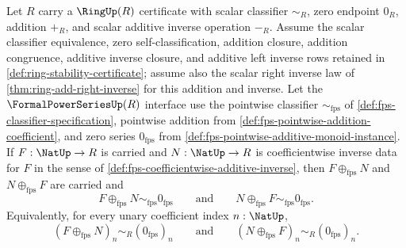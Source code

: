 \begin{theorem}
\label{thm:fps-coefficientwise-additive-inverse-zero-laws}
Let $R$ carry a $\RingUp(R)$ certificate with scalar classifier $\sim_R$, zero endpoint $0_R$, addition $+_R$, and scalar additive inverse operation $-_R$. Assume the scalar classifier equivalence, zero self-classification, addition closure, addition congruence, additive inverse closure, and additive left inverse rows retained in \autoref{def:ring-stability-certificate}; assume also the scalar right inverse law of \autoref{thm:ring-add-right-inverse} for this addition and inverse. Let the $\FormalPowerSeriesUp(R)$ interface use the pointwise classifier $\sim_{\mathrm{fps}}$ of \autoref{def:fps-classifier-specification}, pointwise addition from \autoref{def:fps-pointwise-addition-coefficient}, and zero series $0_{\mathrm{fps}}$ from \autoref{def:fps-pointwise-additive-monoid-instance}. If $F:\NatUp\to R$ is carried and $N:\NatUp\to R$ is coefficientwise inverse data for $F$ in the sense of \autoref{def:fps-coefficientwise-additive-inverse}, then $F\oplus_{\mathrm{fps}}N$ and $N\oplus_{\mathrm{fps}}F$ are carried and
$$
F\oplus_{\mathrm{fps}}N\sim_{\mathrm{fps}}0_{\mathrm{fps}}
\qquad\text{and}\qquad
N\oplus_{\mathrm{fps}}F\sim_{\mathrm{fps}}0_{\mathrm{fps}}.
$$
Equivalently, for every unary coefficient index $n:\NatUp$,
$$
(F\oplus_{\mathrm{fps}}N)_n\sim_R(0_{\mathrm{fps}})_n
\qquad\text{and}\qquad
(N\oplus_{\mathrm{fps}}F)_n\sim_R(0_{\mathrm{fps}})_n.
$$
\end{theorem}
